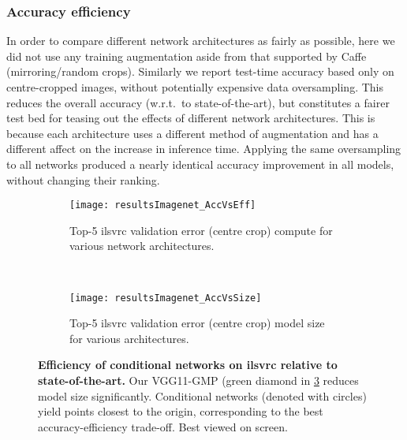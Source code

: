 \documentclass[thesis]{subfiles}
\begin{document}
	\subsubsection{Accuracy \vs{}efficiency}
	In order to compare different network architectures as fairly as possible, here we did not use any training
	augmentation aside from that supported by Caffe~\citep{Jia2014} (mirroring/random crops). Similarly we report test-time 
	accuracy based only on centre-cropped images, without potentially expensive data oversampling. 
	This reduces the overall accuracy (w.r.t.\ to state-of-the-art), but constitutes a fairer test bed for teasing out the effects of different network architectures. This is because each architecture uses a different method of augmentation and has a different affect on the increase in inference time.
	Applying the same oversampling to all networks produced a nearly identical accuracy improvement in 
	all models, without changing their ranking.
	
	
	
	\begin{figure}[tbp] 
		\centering
		\begin{subfigure}[b]{0.95\linewidth}
			\centering
			\texttt{[image: resultsImagenet\_AccVsEff]}
			\caption{Top-5 \gls{ilsvrc} validation error (centre crop) \vs{}compute for various network architectures.}\label{fig:resultsImagenet_AccVsEff}
		\end{subfigure}
		~
		\begin{subfigure}[b]{0.95\linewidth}
			\centering
			\texttt{[image: resultsImagenet\_AccVsSize]}
			\caption{Top-5 \gls{ilsvrc} validation error (centre crop) \vs{}model size for various architectures.}\label{fig:resultsImagenet_AccVsSize}
		\end{subfigure}
		\caption[Efficiency of conditional networks on \gls{ilsvrc} relative to state-of-the-art]{\textbf{Efficiency of conditional networks on \gls{ilsvrc} relative to state-of-the-art.} Our VGG11-GMP (green diamond in \cref{fig:Imagenet_results} reduces model size significantly. Conditional networks (denoted with circles) yield points closest to the origin, corresponding to the best accuracy-efficiency trade-off. Best viewed on screen.}\label{fig:Imagenet_results}
	\end{figure}
	
\end{document}
